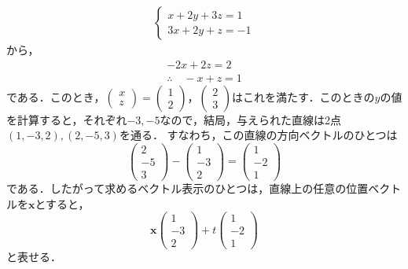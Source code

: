 \documentclass[uplatex,dvipdfmx,a4paper,10pt,fleqn]{jsarticle}
\begin{document}
\begin{tleftbar}
\begin{align*}
    \begin{cases}
        x+2y+3z=1 \\
        3x+2y+z=-1
    \end{cases}
\end{align*}
から，
\begin{gather*}
    -2x+2z=2 \\
    \therefore \quad -x+z=1
\end{gather*}
である．このとき，$
    \begin{pmatrix}
        x \\
        z
    \end{pmatrix}
 =
    \begin{pmatrix}
        1 \\
        2
    \end{pmatrix}
，
    \begin{pmatrix}
        2 \\
        3
    \end{pmatrix}
$はこれを満たす．このときの$y$の値を計算すると，それぞれ$-3,-5$なので，結局，与えられた直線は2点$(1,-3,2),(2,-5,3)$を通る．
すなわち，この直線の方向ベクトルのひとつは
\[
\begin{pmatrix}
    2 \\
    -5 \\
    3
\end{pmatrix}
    -
        \begin{pmatrix}
            1 \\
            -3 \\
            2
        \end{pmatrix}
            =
                \begin{pmatrix}
                    1 \\
                    -2 \\
                    1
                \end{pmatrix}
                    \]
である．したがって求めるベクトル表示のひとつは，直線上の任意の位置ベクトルを$\bm{x}$とすると，
\[
    \bm{x}
        \begin{pmatrix}
            1 \\
            -3 \\
            2
        \end{pmatrix}
            +t
            \begin{pmatrix}
                1 \\
                -2 \\
                1
            \end{pmatrix}
            \]
            と表せる．
\end{tleftbar}
\end{document}
